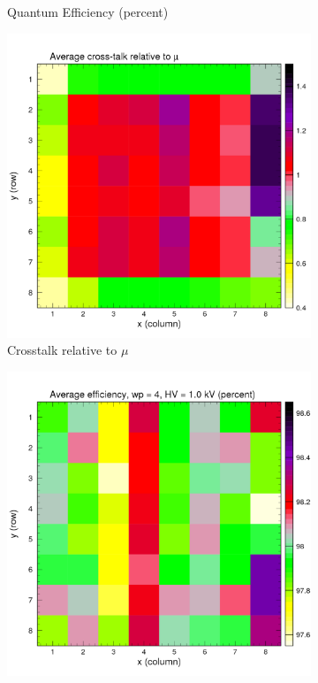 \begin{figure}[t!]
\begin{subfigure}[c]{0.48\linewidth}
		\caption{Quantum Efficiency (percent)}
		\vspace{0mm}
	\end{subfigure}%
	\vspace{3mm}
	\begin{subfigure}[c]{0.48\linewidth}
		\centering
		\includegraphics[width=\linewidth]{figures/pglobal_beta_r.pdf}
		\caption{Crosstalk relative to $\mu$}
		\vspace{0mm}
	\end{subfigure}%
	\begin{subfigure}[c]{0.48\linewidth}
		\vspace{3mm}
		\centering
		\includegraphics[width=\linewidth]{figures/pglobal_eff2d_r4.pdf}

\end{subfigure}
\end{figure}
